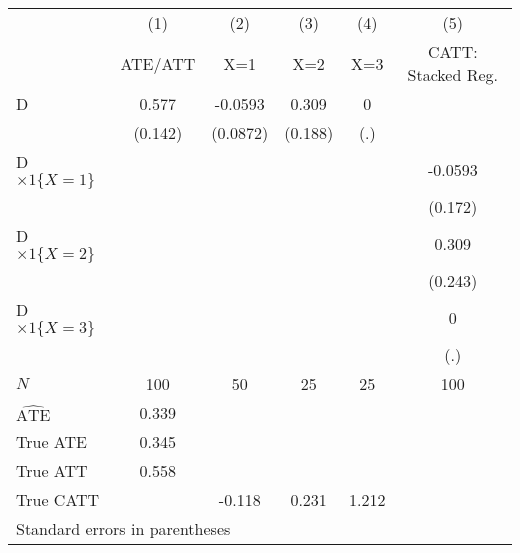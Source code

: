 \begin{tabular}{l*{5}{c}}
\hline\hline
                    &\multicolumn{1}{c}{(1)}&\multicolumn{1}{c}{(2)}&\multicolumn{1}{c}{(3)}&\multicolumn{1}{c}{(4)}&\multicolumn{1}{c}{(5)}\\
                    &\multicolumn{1}{c}{ATE/ATT}&\multicolumn{1}{c}{X=1}&\multicolumn{1}{c}{X=2}&\multicolumn{1}{c}{X=3}&\multicolumn{1}{c}{CATT: Stacked Reg.}\\
\hline
D                   &       0.577&     -0.0593&       0.309&           0&            \\
                    &     (0.142)&    (0.0872)&     (0.188)&         (.)&            \\
[1em]
D $\times 1\{X=1\}$ &            &            &            &            &     -0.0593\\
                    &            &            &            &            &     (0.172)\\
[1em]
D $\times 1\{X=2\}$ &            &            &            &            &       0.309\\
                    &            &            &            &            &     (0.243)\\
[1em]
D $\times 1\{X=3\}$ &            &            &            &            &           0\\
                    &            &            &            &            &         (.)\\
\hline
$N$                 &         100&          50&          25&          25&         100\\
$\widehat{\text{ATE}}$&       0.339&            &            &            &            \\
True ATE            &       0.345&            &            &            &            \\
True ATT            &       0.558&            &            &            &            \\
True CATT           &            &      -0.118&       0.231&       1.212&            \\
\hline\hline
\multicolumn{6}{l}{\footnotesize Standard errors in parentheses}\\
\end{tabular}
